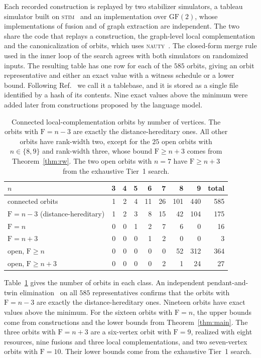 \documentclass[aps,pra,onecolumn,superscriptaddress,nofootinbib,longbibliography]{revtex4-2}
\theoremstyle{plain}
\theoremstyle{remark}
\newcommand{\F}{\mathrm{F}}
\begin{document}
Each recorded construction is replayed by two stabilizer simulators, a tableau simulator built on
\textsc{stim}~\cite{Gidney2021stim} and an implementation over $\mathrm{GF}(2)$, whose implementations of
fusion and of graph extraction are independent. The two share the code that replays a construction, the graph-level
local complementation and the canonicalization of orbits, which uses \textsc{nauty}~\cite{McKay2014practical}.
The closed-form merge rule used in the inner loop of the search agrees with both simulators on randomized
inputs. The resulting table has one row for each of the $585$
orbits, giving an orbit representative and either an exact value with a witness schedule or a lower
bound. Following Ref.~\cite{Lobl2025generating} we call it a tablebase, and it is stored as a single file
identified by a hash of its contents. Nine exact values above the minimum were added later from constructions proposed
by the language model.

\begin{table}[t]
\centering
\begin{tabular}{lrrrrrrrr}
\toprule
$n$ & 3 & 4 & 5 & 6 & 7 & 8 & 9 & total\\
\midrule
connected orbits               & 1 & 2 & 4 & 11 & 26 & 101 & 440 & 585\\
$\F=n-3$ (distance-hereditary) & 1 & 2 & 3 &  8 & 15 &  42 & 104 & 175\\
$\F=n$                         & 0 & 0 & 1 &  2 &  7 &   6 &   0 &  16\\
$\F=n+3$                       & 0 & 0 & 0 &  1 &  2 &   0 &   0 &   3\\
open, $\F\ge n$                & 0 & 0 & 0 &  0 &  0 &  52 & 312 & 364\\
open, $\F\ge n+3$              & 0 & 0 & 0 &  0 &  2 &   1 &  24 &  27\\
\bottomrule
\end{tabular}
\caption{Connected local-complementation orbits by number of vertices. The orbits with $\F=n-3$ are
exactly the distance-hereditary ones. All other orbits have rank-width two, except for the $25$ open orbits
with $n\in\{8,9\}$ and rank-width three, whose bound $\F\ge n+3$ comes from Theorem~\ref{thm:rw}. The two
open orbits with $n=7$ have $\F\ge n+3$ from the exhaustive Tier~1 search.}
\label{tab:counts}
\end{table}

Table~\ref{tab:counts} gives the number of orbits in each class. An independent pendant-and-twin
elimination~\cite{Bandelt1986distance} on all $585$ representatives confirms that the orbits with $\F=n-3$ are exactly the distance-hereditary
ones. Nineteen orbits have exact values above the minimum. For the sixteen orbits with $\F=n$, the upper
bounds come from constructions and the lower bounds from Theorem~\ref{thm:main}. The three orbits with
$\F=n+3$ are a six-vertex orbit with $\F=9$, realized with eight resources, nine fusions and three local
complementations, and two seven-vertex orbits with $\F=10$. Their lower bounds come from the exhaustive
Tier~1 search.
\end{document}
